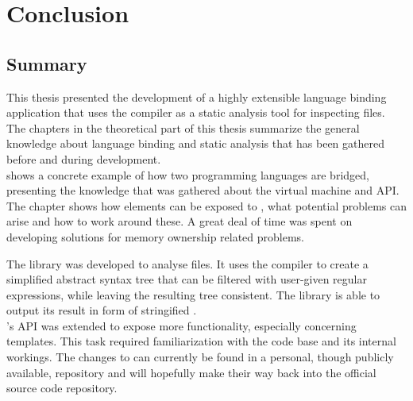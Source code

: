 \part{Conclusion}
\chapter{Summary}

This thesis presented the development of a highly extensible language binding application that uses the  compiler as a static analysis tool for inspecting  files.\\
The chapters in the theoretical part of this thesis summarize the general knowledge about language binding and static analysis that has been gathered before and during development.\\
 shows a concrete example of how two programming languages are bridged, presenting the knowledge that was gathered about the   virtual machine and API. The chapter shows how  elements can be exposed to , what potential problems can arise and how to work around these. A great deal of time was spent on developing solutions for memory ownership related problems.

The  library was developed to analyse  files. It uses the  compiler to create a simplified abstract syntax tree that can be filtered with user-given regular expressions, while leaving the resulting tree consistent. The library is able to output its result in form of stringified .\\
's  API was extended to expose more  functionality, especially concerning  templates. This task required familiarization with the  code base and its internal workings. The changes to  can currently be found in a personal, though publicly available,  repository and will hopefully make their way back into the official  source code repository.

